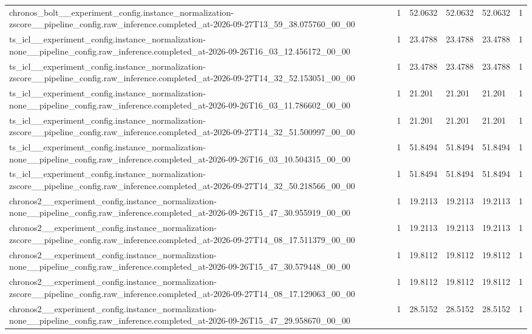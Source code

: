 \begin{tabular}{llllll}
chronos\_bolt\_\_experiment\_config.instance\_normalization-zscore\_\_pipeline\_config.raw\_inference.completed\_at-2026-09-27T13\_59\_38.075760\_00\_00 & 1 & 52.0632 & 52.0632 & 52.0632 & 1 \\
ts\_icl\_\_experiment\_config.instance\_normalization-none\_\_pipeline\_config.raw\_inference.completed\_at-2026-09-26T16\_03\_12.456172\_00\_00 & 1 & 23.4788 & 23.4788 & 23.4788 & 1 \\
ts\_icl\_\_experiment\_config.instance\_normalization-zscore\_\_pipeline\_config.raw\_inference.completed\_at-2026-09-27T14\_32\_52.153051\_00\_00 & 1 & 23.4788 & 23.4788 & 23.4788 & 1 \\
ts\_icl\_\_experiment\_config.instance\_normalization-none\_\_pipeline\_config.raw\_inference.completed\_at-2026-09-26T16\_03\_11.786602\_00\_00 & 1 & 21.201 & 21.201 & 21.201 & 1 \\
ts\_icl\_\_experiment\_config.instance\_normalization-zscore\_\_pipeline\_config.raw\_inference.completed\_at-2026-09-27T14\_32\_51.500997\_00\_00 & 1 & 21.201 & 21.201 & 21.201 & 1 \\
ts\_icl\_\_experiment\_config.instance\_normalization-none\_\_pipeline\_config.raw\_inference.completed\_at-2026-09-26T16\_03\_10.504315\_00\_00 & 1 & 51.8494 & 51.8494 & 51.8494 & 1 \\
ts\_icl\_\_experiment\_config.instance\_normalization-zscore\_\_pipeline\_config.raw\_inference.completed\_at-2026-09-27T14\_32\_50.218566\_00\_00 & 1 & 51.8494 & 51.8494 & 51.8494 & 1 \\
chronos2\_\_experiment\_config.instance\_normalization-none\_\_pipeline\_config.raw\_inference.completed\_at-2026-09-26T15\_47\_30.955919\_00\_00 & 1 & 19.2113 & 19.2113 & 19.2113 & 1 \\
chronos2\_\_experiment\_config.instance\_normalization-zscore\_\_pipeline\_config.raw\_inference.completed\_at-2026-09-27T14\_08\_17.511379\_00\_00 & 1 & 19.2113 & 19.2113 & 19.2113 & 1 \\
chronos2\_\_experiment\_config.instance\_normalization-none\_\_pipeline\_config.raw\_inference.completed\_at-2026-09-26T15\_47\_30.579448\_00\_00 & 1 & 19.8112 & 19.8112 & 19.8112 & 1 \\
chronos2\_\_experiment\_config.instance\_normalization-zscore\_\_pipeline\_config.raw\_inference.completed\_at-2026-09-27T14\_08\_17.129063\_00\_00 & 1 & 19.8112 & 19.8112 & 19.8112 & 1 \\
chronos2\_\_experiment\_config.instance\_normalization-none\_\_pipeline\_config.raw\_inference.completed\_at-2026-09-26T15\_47\_29.958670\_00\_00 & 1 & 28.5152 & 28.5152 & 28.5152 & 1 \\

\end{tabular}
